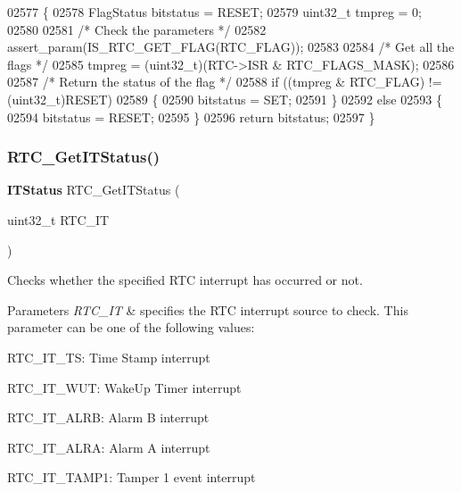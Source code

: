 \begin{DoxyCode}
02577 \{
02578   FlagStatus bitstatus = RESET;
02579   uint32\_t tmpreg = 0;
02580   
02581   \textcolor{comment}{/* Check the parameters */}
02582   assert_param(IS_RTC_GET_FLAG(RTC\_FLAG));
02583   
02584   \textcolor{comment}{/* Get all the flags */}
02585   tmpreg = (uint32\_t)(RTC->ISR & RTC_FLAGS_MASK);
02586   
02587   \textcolor{comment}{/* Return the status of the flag */}
02588   \textcolor{keywordflow}{if} ((tmpreg & RTC\_FLAG) != (uint32\_t)RESET)
02589   \{
02590     bitstatus = SET;
02591   \}
02592   \textcolor{keywordflow}{else}
02593   \{
02594     bitstatus = RESET;
02595   \}
02596   \textcolor{keywordflow}{return} bitstatus;
02597 \}
\end{DoxyCode}
\mbox{\label{group__RTC__Group13_gaab81adc6d2a5a5c1e37a49707c6bf640}} 
\subsubsection{R\+T\+C\+\_\+\+Get\+I\+T\+Status()}
{\footnotesize\ttfamily \textbf{ I\+T\+Status} R\+T\+C\+\_\+\+Get\+I\+T\+Status (\begin{DoxyParamCaption}\item[{uint32\+\_\+t}]{R\+T\+C\+\_\+\+IT }\end{DoxyParamCaption})}



Checks whether the specified R\+TC interrupt has occurred or not. 


\begin{DoxyParams}{Parameters}
{\em R\+T\+C\+\_\+\+IT} & specifies the R\+TC interrupt source to check. This parameter can be one of the following values\+: \begin{DoxyItemize}
\item R\+T\+C\+\_\+\+I\+T\+\_\+\+TS\+: Time Stamp interrupt \item R\+T\+C\+\_\+\+I\+T\+\_\+\+W\+UT\+: Wake\+Up Timer interrupt \item R\+T\+C\+\_\+\+I\+T\+\_\+\+A\+L\+RB\+: Alarm B interrupt \item R\+T\+C\+\_\+\+I\+T\+\_\+\+A\+L\+RA\+: Alarm A interrupt \item R\+T\+C\+\_\+\+I\+T\+\_\+\+T\+A\+M\+P1\+: Tamper 1 event interrupt \end{DoxyItemize}
\\
\hline
\end{DoxyParams}

